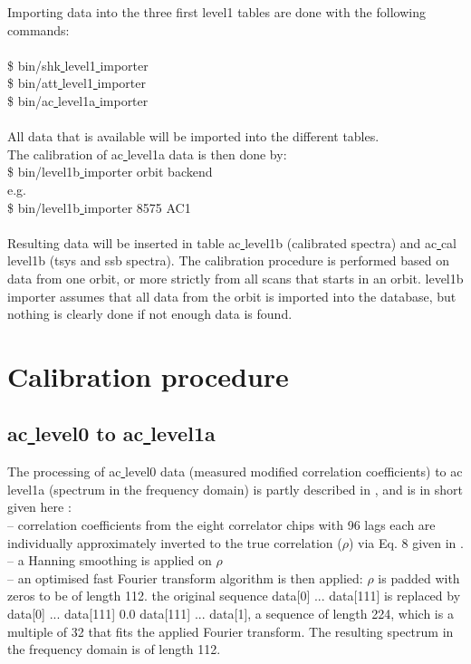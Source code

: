 \documentclass[12pt]{article}
\begin{document}
Importing data into the three first level1 tables are done 
with the following commands:\\
\\
\$ bin/shk\underline{ }level1\underline{ }importer\\
\$ bin/att\underline{ }level1\underline{ }importer\\
\$ bin/ac\underline{ }level1a\underline{ }importer\\
\\
All data that is available will be imported 
into the different tables. \\

The calibration of ac\underline{ }level1a data is then done by:\\
\$ bin/level1b\underline{ }importer orbit backend\\
e.g.\\
\$ bin/level1b\underline{ }importer 8575 AC1\\
\\  
Resulting data will be inserted in table ac\underline{ }level1b 
(calibrated spectra) and
ac\underline{ }cal\underline{ }level1b (tsys and ssb spectra). 
The calibration procedure is performed based on data from
one orbit, or more strictly from all scans that starts in an orbit.
level1b\underline{ }importer assumes that all data from the orbit
is imported into the database, but nothing is clearly done if not
enough data is found.



\section{Calibration procedure}
\label{sec:cal}

\subsection{ac\underline{ }level0 to ac\underline{ }level1a}
The processing of ac\underline{ }level0 data
(measured modified correlation coefficients)
to ac\underline{ }level1a (spectrum in the frequency domain)
is partly described in \cite{notes}, and is in short given here :\\
-- correlation coefficients from the eight correlator chips
with 96 lags each are individually approximately inverted to
the true correlation (\(\rho\)) via Eq. 8 given in \cite{notes}.\\
-- a Hanning smoothing is applied on \(\rho\)\\
-- an optimised fast Fourier transform algorithm is then applied:
\(\rho\) is padded with zeros to be of length 112.
the original sequence data[0] ... data[111] is replaced by 
data[0] ... data[111] 0.0 data[111] ... data[1], a sequence of length 
224, which is a multiple of 32 that fits the applied Fourier transform.
The resulting spectrum in the frequency domain is of length
112.  
\end{document}
